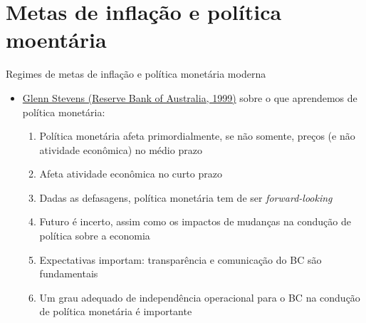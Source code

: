 \documentclass[10pt]{beamer}
\begin{document}
\section{Metas de inflação e política moentária}
\begin{frame}
    {Regimes de metas de inflação e política monetária moderna}
    \begin{itemize}
        \item \href{https://www.rba.gov.au/publications/bulletin/1999/may/pdf/bu-0599-2.pdf}{Glenn Stevens (Reserve Bank of Australia, 1999)} sobre o que aprendemos de política monetária:\medskip
        \begin{enumerate}
            \item Política monetária afeta primordialmente, se não somente, preços (e não atividade econômica) no médio prazo\medskip
            \item Afeta atividade econômica no curto prazo\medskip
            \item Dadas as defasagens, política monetária tem de ser \emph{forward-looking}\medskip
            \item Futuro é incerto, assim como os impactos de mudanças na condução de política sobre a economia\medskip
            \item Expectativas importam: transparência e comunicação do BC são fundamentais\medskip
            \item Um grau adequado de independência operacional para o BC na condução de política monetária é importante
        \end{enumerate}
    \end{itemize}
\end{frame}
\end{document}

